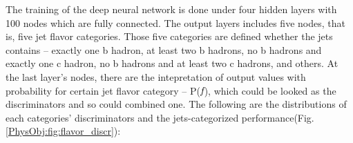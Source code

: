 			The training of the deep neural network is done under four hidden layers with 100 nodes which are fully connected. The output layers includes five nodes, that is, five jet flavor categories. Those five categories are defined whether the jets contains -- exactly one b hadron, at least two b hadrons, no b hadrons and exactly one c hadron, no b hadrons and at least two c hadrons, and others. At the last layer's nodes, there are the intepretation of output values with probability for certain jet flavor category -- P($\emph{f}$), which could be looked as the discriminators and so could combined one. The following are the distributions of each categories' discriminators and the jets-categorized performance(Fig.\ref{PhysObj:fig:flavor_discr}):

			\begin{figure}[H]
			\centering
			    \\
			\end{figure}
			\FloatBarrier
			\begin{figure}[H]
			\centering
			    \\
			\end{figure}
